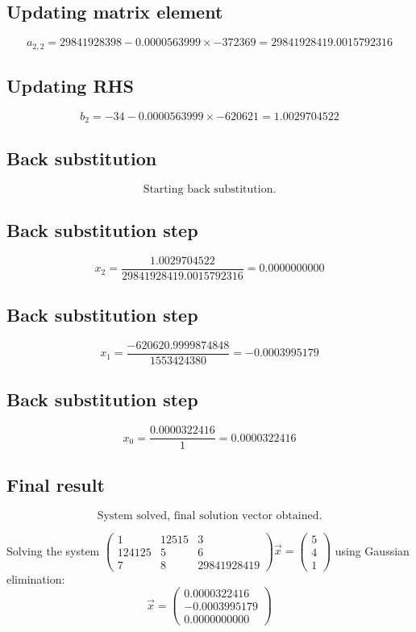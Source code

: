 \documentclass{article}
\begin{document}
\subsection*{ \vspace{1em} Updating matrix element}
\[
a_{2,2} = 29841928398 - 0.0000563999 \times -372369 = 29841928419.0015792316
\]
\subsection*{ \vspace{1em} Updating RHS}
\[
b_{2} = -34 - 0.0000563999 \times -620621 = 1.0029704522
\]
\subsection*{ \vspace{1em} Back substitution}
\[
\text{Starting back substitution.}
\]
\subsection*{ \vspace{1em} Back substitution step}
\[
x_{2} = \frac{1.0029704522}{29841928419.0015792316} = 0.0000000000
\]
\subsection*{ \vspace{1em} Back substitution step}
\[
x_{1} = \frac{-620620.9999874848}{1553424380} = -0.0003995179
\]
\subsection*{ \vspace{1em} Back substitution step}
\[
x_{0} = \frac{0.0000322416}{1} = 0.0000322416
\]
\subsection*{ \vspace{1em} Final result}
\[
\text{System solved, final solution vector obtained.}
\]
\medskip

Solving the system $\begin{pmatrix}1 & 12515 & 3 \\ 124125 & 5 & 6 \\ 7 & 8 & 29841928419\end{pmatrix}\vec{x} = \begin{pmatrix}5 \\ 4 \\ 1\end{pmatrix}$ using Gaussian elimination:
\[
\vec{x} = \begin{pmatrix}0.0000322416 \\ -0.0003995179 \\ 0.0000000000\end{pmatrix}
\]
\bigskip
\end{document}
